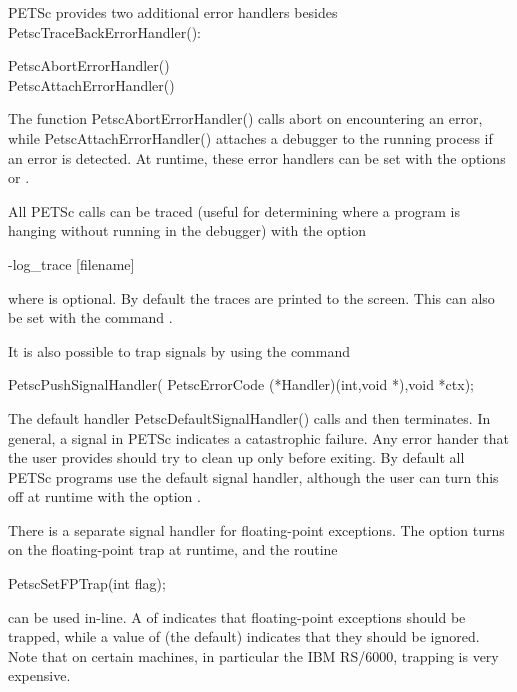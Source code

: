 {{{PETSc provides two additional error handlers besides 
PetscTraceBackErrorHandler():
 
\begin{tabbing}
   PetscAbortErrorHandler()\\
   PetscAttachErrorHandler()
\end{tabbing}
The function PetscAbortErrorHandler() calls abort on encountering an error, while
PetscAttachErrorHandler() attaches a debugger to the running process
if an error is detected. At runtime, these error handlers can be set
with the options  or   .

All PETSc calls can be traced (useful for determining where a program is 
hanging without running in the debugger) with the option
\begin{tabbing}
  -log\_trace [filename]
\end{tabbing}
where  is optional. By default the traces are printed to the 
screen.  This can also be set with the 
command .  


It is also possible to trap signals by using the 
command 
\begin{tabbing}
  PetscPushSignalHandler( PetscErrorCode (*Handler)(int,void *),void *ctx);
\end{tabbing}
The default handler PetscDefaultSignalHandler() 
calls  
 and then terminates. In general, a signal in PETSc
indicates a catastrophic failure.  Any error hander that the user provides
should try to clean up only before exiting.  By default all PETSc programs
use the default signal handler, although the user can turn this off 
at runtime with the 
option  .

There is a separate signal handler for floating-point exceptions.
  
The option  turns on the floating-point trap at runtime,
and the routine   
\begin{tabbing}
  PetscSetFPTrap(int flag);
\end{tabbing}
can be used in-line.
A  of  
indicates that floating-point exceptions should be trapped,
while a value of  (the default) indicates that they 
should be ignored.  Note that on certain machines, in particular 
the IBM RS/6000, trapping is very expensive.

}}}
